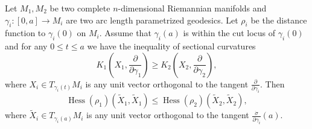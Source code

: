\begin{exercise}
\label{geometry:2015:12}
Let $M_{1}, M_{2}$ be two complete $n$-dimensional Riemannian manifolds and $\gamma_{i} : [0, a] \to M_{i}$ are two arc length parametrized geodesics. Let $\rho_{i}$ be the distance function to $\gamma_{i}(0)$ on $M_{i}$. Assume that $\gamma_{i}(a)$ is within the cut locus of $\gamma_{i}(0)$ and for any $0 \leq t \leq a$ we have the inequality of sectional curvatures
\[ K_{1}\!\left(X_{1}, \frac{\partial}{\partial \gamma_{1}}\right) \geq K_{2}\!\left(X_{2}, \frac{\partial}{\partial \gamma_{2}}\right), \]
where $X_{i} \in T_{\gamma_{i}(t)}M_{i}$ is any unit vector orthogonal to the tangent $\frac{\partial}{\partial \gamma_{i}}$.
Then
\[ \operatorname{Hess}(\rho_{1})(\tilde{X}_{1}, \tilde{X}_{1}) \leq \operatorname{Hess}(\rho_{2})(\tilde{X}_{2}, \tilde{X}_{2}), \]
where $\tilde{X}_{i} \in T_{\gamma_{i}(a)}M_{i}$ is any unit vector orthogonal to the tangent $\frac{\dot{\sigma}}{\partial \gamma_{i}}(a)$.
\end{exercise}

